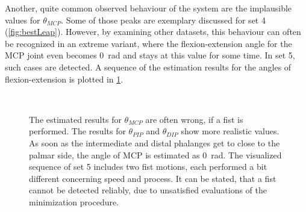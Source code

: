 Another, quite common observed behaviour of the system are the implausible values for $ \theta_{MCP} $. Some of those peaks are exemplary discussed for set 4 (\ref{fig:bestLeap}). However, by examining other datasets, this behaviour can often be recognized in an extreme variant, where the flexion-extension angle for the \ac{MCP} joint even becomes \SI{0}{\radian} and stays at this value for some time. In set 5, such cases are detected. A sequence of the estimation results for the angles of flexion-extension is plotted in \ref{fig:set5}.
\begin{figure}[!htb]
\centering
{}\\
\caption[Occurrence of wrong estimated states for $ \theta_{MCP} $]
{The estimated results for $ \theta_{MCP} $ are often wrong, if a fist is performed. The results for $ \theta_{PIP} $ and $ \theta_{DIP} $ show more realistic values. As soon as the intermediate and distal phalanges get to close to the palmar side, the angle of \ac{MCP} is estimated as \SI{0}{\radian}. The visualized sequence of set 5 includes two fist motions, each performed a bit different concerning speed and process. It can be stated, that a fist cannot be detected reliably, due to unsatisfied evaluations of the minimization procedure.}
\label{fig:set5}
\end{figure}
